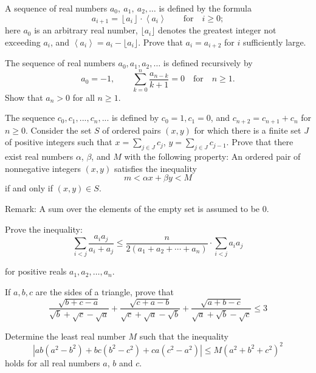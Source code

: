 \item[\textbf{A1.}]
A sequence of real numbers 
$ a_{0},\ a_{1},\ a_{2},\dots$
 is defined by the formula
\[ a_{i + 1} = \left\lfloor a_{i}\right\rfloor\cdot \left\langle a_{i}\right\rangle\qquad\text{for}\quad i\geq 0;
\]
here 
$a_0$
 is an arbitrary real number, 
$\lfloor a_i\rfloor$
 denotes the greatest integer not exceeding 
$a_i$, 
 and 
$\left\langle a_i\right\rangle=a_i-\lfloor a_i\rfloor$.
  Prove that 
$a_i=a_{i+2}$
 for 
$i$
 sufficiently large.

\item[\textbf{A2.}]
The sequence of real numbers 
$a_0,a_1,a_2,\ldots$
 is defined recursively by 
\[a_0=-1,\qquad\sum_{k=0}^n\dfrac{a_{n-k}}{k+1}=0\quad\text{for}\quad n\geq 1.\]
Show that 
$ a_{n} > 0$
 for all 
$ n\geq 1$.

\item[\textbf{A3.}]
The sequence 
$c_{0}, c_{1}, . . . , c_{n}, . . .$
 is defined by 
$c_{0}= 1, c_{1}= 0$, 
 and 
$c_{n+2}= c_{n+1}+c_{n}$
 for 
$n \geq 0$.
 Consider the set 
$S$
 of ordered pairs 
$(x, y)$
 for which there is a finite set 
$J$
 of positive integers such that 
$x=\textstyle\sum_{j \in J}{c_{j}}$, 
$y=\textstyle\sum_{j \in J}{c_{j-1}}$.
 Prove that there exist real numbers 
$\alpha$, 
$\beta$, 
 and 
$M$
 with the following property: An ordered pair of nonnegative integers 
$(x, y)$
 satisfies the inequality 
\[m < \alpha x+\beta y < M\]
 if and only if 
$(x, y) \in S$.

Remark:
 A sum over the elements of the empty set is assumed to be 
$0$.

\item[\textbf{A4.}]
Prove the inequality:
\[\sum_{i < j}{\frac {a_{i}a_{j}}{a_{i} + a_{j}}}\leq \frac {n}{2(a_{1} + a_{2} +\cdots + a_{n})}\cdot \sum_{i < j}{a_{i}a_{j}}\]


for positive reals 
$ a_{1},a_{2},\ldots,a_{n}$.

\item[\textbf{A5.}]
If 
$a,b,c$
 are the sides of a triangle, prove that
\[\frac{\sqrt{b+c-a}}{\sqrt{b}+\sqrt{c}-\sqrt{a}}+\frac{\sqrt{c+a-b}}{\sqrt{c}+\sqrt{a}-\sqrt{b}}+\frac{\sqrt{a+b-c}}{\sqrt{a}+\sqrt{b}-\sqrt{c}}\leq 3 \]

\item[\textbf{A6.}]
Determine the least real number 
$M$
 such that the inequality 
\[|ab(a^{2}-b^{2})+bc(b^{2}-c^{2})+ca(c^{2}-a^{2})| \leq M(a^{2}+b^{2}+c^{2})^{2}\]
 holds for all real numbers 
$a$, 
$b$
 and 
$c$.

